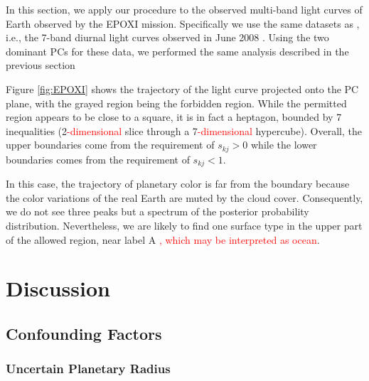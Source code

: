 \documentclass[iop,numberedappendix,apj]{emulateapj}
\def\edit#1{\textcolor{red}{#1}}
\begin{document}
In this section, we apply our procedure to the observed multi-band light curves of Earth observed by the EPOXI mission. 
Specifically we use the same datasets as \citet{Cowan2013}, i.e., the 7-band diurnal light curves observed in June 2008 \citep{Livengood2011}. 
Using the two dominant PCs for these data, we performed the same analysis described in the previous section 

Figure \ref{fig:EPOXI} shows the trajectory of the light curve projected onto the PC plane, with the grayed region being the forbidden region. 
While the permitted region appears to be close to a square, it is in fact a heptagon, bounded by 7 inequalities (2\edit{-dimensional} slice through a 7\edit{-dimensional} hypercube). 
Overall, the upper boundaries come from the requirement of $s_{kj}>0$ while the lower boundaries comes from the requirement of $s_{kj}<1$. 

In this case, the trajectory of planetary color is far from the boundary because the color variations of the real Earth are muted by the cloud cover. 
Consequently, we do not see three peaks but a spectrum of the posterior probability distribution. 
Nevertheless, we are likely to find one surface type in the upper part of the allowed region, near label A \edit{, which may be interpreted as ocean}. 


\section{Discussion}
\label{s:discussion}

\subsection{Confounding Factors}
\label{ss:confonting_factors}


\subsubsection{Uncertain Planetary Radius}

\end{document}
